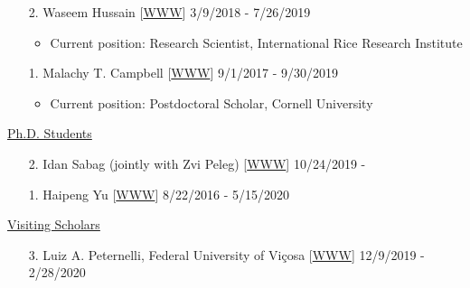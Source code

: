 \documentclass[margin,line,10pt]{res}
\begin{document}
\begin{resume}
\begin{enumerate}
  \vspace{0.3cm}
  
\item [2.] Waseem Hussain  [\textcolor{blue}{\href{https://whussain2.github.io/}{WWW}}]  \hfill 3/9/2018 - 7/26/2019
  \begin{itemize} 
  \item Current position: Research Scientist, International Rice Research Institute
  \end{itemize}
   
  \vspace{0.3cm}
  
\item [1.] Malachy T. Campbell  [\textcolor{blue}{\href{https://malachycampbell.github.io/}{WWW}}]  \hfill  9/1/2017 - 9/30/2019
  \begin{itemize} 
  \item Current position: Postdoctoral Scholar, Cornell University 
  \end{itemize}
\end{enumerate}



\begin{flushleft}
\hspace{0.2cm} \underline{Ph.D. Students}
\end{flushleft}
\begin{enumerate}

  \item [2.] Idan Sabag (jointly with Zvi Peleg) [\textcolor{blue}{\href{}{WWW}}]  \hfill  10/24/2019 -

    \vspace{0.3cm}

\item [1.] Haipeng Yu [\textcolor{blue}{\href{https://haipengu.github.io/}{WWW}}]  \hfill 8/22/2016 - 5/15/2020
\end{enumerate}








\begin{flushleft}
\hspace{0.2cm} \underline{Visiting Scholars}
\end{flushleft}
\begin{enumerate}

\item [3.] Luiz A. Peternelli, Federal University of Vi\c cosa [\textcolor{blue}{\href{http://www.dpi.ufv.br/~peternelli/}{WWW}}]  \hfill 12/9/2019 - 2/28/2020


\end{enumerate}
\end{resume}
\end{document}
